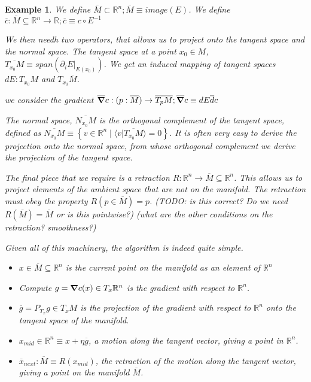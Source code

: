\documentclass[11pt]{book}
\newtheorem{example}[theorem]{Example}
\begin{document}
\begin{example}
We define $\overline M \subset \mathbb R^n; \overline M \equiv image(E)$.
We define $\overline c: \overline M \subseteq \mathbb R^n \rightarrow \mathbb R; \overline c \equiv c \circ E^{-1}$

We then needh two operators, that allows us to project onto the tangent space
and the normal space. The tangent space at a point $x_0 \in M$, $\overline{T_{x_0} M} \equiv span(\partial_i E |_{E(x_0)})$. 
We get an induced mapping of tangent spaces $dE: T_{x_0} M$ and $T_{x_0} \overline M$.

we consider the gradient
$\overline \grad c : (p: \overline M) \rightarrow \overline{T_p M}; \overline \grad c \equiv dE \overline dc$

The normal space,
$\overline{N_{x_0} M}$ is the orthogonal complement of the tangent space, defined
as $\overline{N_{x_0} M} \equiv \left\{ v \in \mathbb R^n \mid \langle v | \overline{T_{x_0} M} \rangle = 0 \right\}$.
It is often very easy to derive the projection onto the normal space, from
whose orthogonal complement we derive the projection of the tangent space.

The final piece that we require is a retraction $R: \mathbb R^n \rightarrow \overline M \subseteq \mathbb R^n$. This allows
us to project elements of the ambient space that are not on the manifold. The
retraction must obey the property $R(p \in \overline M) = p$.
(TODO: is this correct? Do we need $R(\overline M) = \overline M$ or is this pointwise?)
(what are the other conditions on the retraction? smoothness?)

Given all of this machinery, the algorithm is indeed quite simple. 

\begin{itemize}
    \item $x \in \overline M \subseteq \mathbb R^n$ is the current point on the manifold as an element of $\mathbb R^n$
    \item Compute $g = \grad c(x) \in T_x \mathbb R^n$ is the gradient with respect to $\mathbb R^n$.
    \item $\overline g = P_{T_x} g \in T_x M$ is the projection of the gradient with respect to $\mathbb R^n$ onto the 
            tangent space of the manifold.
    \item $x_{mid}\in \mathbb R^n \equiv x + \eta \overline g$, a motion along the tangent vector, giving a point in
            $\mathbb R^n$.
    \item $\overline x_{next}: \overline M \equiv R(x_{mid})$, the retraction of the motion along the tangent vector,
        giving a point on the manifold $\overline M$.
\end{itemize}



\end{example}
\end{document}
